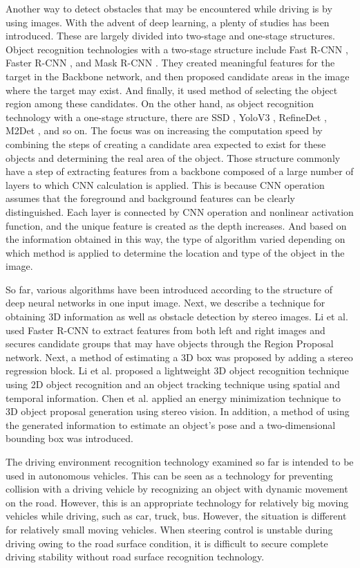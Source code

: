 \documentclass{ieeeaccess}
\begin{document}
Another way to detect obstacles that may be encountered while driving is by using images. With the advent of deep learning, a plenty of studies has been introduced. These are largely divided into two-stage and one-stage structures. Object recognition technologies with a two-stage structure include Fast R-CNN \cite{b23}, Faster R-CNN \cite{b24}, and Mask R-CNN \cite{b25}. They created meaningful features for the target in the Backbone network, and then proposed candidate areas in the image where the target may exist. And finally, it used method of selecting the object region among these candidates. On the other hand, as object recognition technology with a one-stage structure, there are SSD \cite{b26}, YoloV3 \cite{b27}, RefineDet \cite{b28}, M2Det \cite{b29}, and so on. The focus was on increasing the computation speed by combining the steps of creating a candidate area expected to exist for these objects and determining the real area of the object. Those structure commonly have a step of extracting features from a backbone composed of a large number of layers to which CNN calculation is applied. This is because CNN operation assumes that the foreground and background features can be clearly distinguished. Each layer is connected by CNN operation and nonlinear activation function, and the unique feature is created as the depth increases. And based on the information obtained in this way, the type of algorithm varied depending on which method is applied to determine the location and type of the object in the image.

So far, various algorithms have been introduced according to the structure of deep neural networks in one input image. Next, we describe a technique for obtaining 3D information as well as obstacle detection by stereo images. Li et al.\cite{b30} used Faster R-CNN \cite{b24} to extract features from both left and right images and secures candidate groups that may have objects through the Region Proposal network. Next, a method of estimating a 3D box was proposed by adding a stereo regression block. Li et al. \cite{b31} proposed a lightweight 3D object recognition technique using 2D object recognition and an object tracking technique using spatial and temporal information. Chen et al. \cite{b32} applied an energy minimization technique to 3D object proposal generation using stereo vision. In addition, a method of using the generated information to estimate an object's pose and a two-dimensional bounding box was introduced.

The driving environment recognition technology examined so far is intended to be used in autonomous vehicles. This can be seen as a technology for preventing collision with a driving vehicle by recognizing an object with dynamic movement on the road. However, this is an appropriate technology for relatively big moving vehicles while driving, such as car, truck, bus. However, the situation is different for relatively small moving vehicles. When steering control is unstable during driving owing to the road surface condition, it is difficult to secure complete driving stability without road surface recognition technology.
\end{document}
